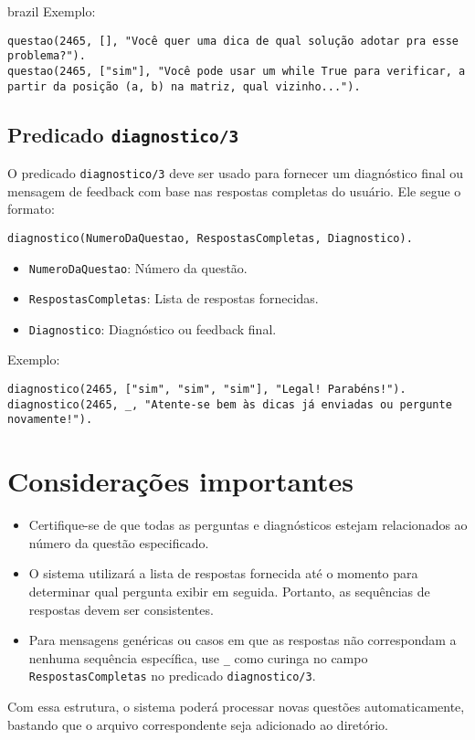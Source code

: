 \begin{otherlanguage*}{brazil}
Exemplo:
\begin{verbatim}
questao(2465, [], "Você quer uma dica de qual solução adotar pra esse problema?").
questao(2465, ["sim"], "Você pode usar um while True para verificar, a partir da posição (a, b) na matriz, qual vizinho...").
\end{verbatim}

\subsection{Predicado \texttt{diagnostico/3}}
O predicado \texttt{diagnostico/3} deve ser usado para fornecer um diagnóstico final ou mensagem de feedback com base nas respostas completas do usuário. Ele segue o formato:
\begin{verbatim}
diagnostico(NumeroDaQuestao, RespostasCompletas, Diagnostico).
\end{verbatim}

\begin{itemize}
    \item \texttt{NumeroDaQuestao}: Número da questão.
    \item \texttt{RespostasCompletas}: Lista de respostas fornecidas.
    \item \texttt{Diagnostico}: Diagnóstico ou feedback final.
\end{itemize}

Exemplo:
\begin{verbatim}
diagnostico(2465, ["sim", "sim", "sim"], "Legal! Parabéns!").
diagnostico(2465, _, "Atente-se bem às dicas já enviadas ou pergunte novamente!").
\end{verbatim}

\section{Considerações importantes}
\begin{itemize}
    \item Certifique-se de que todas as perguntas e diagnósticos estejam relacionados ao número da questão especificado.
    \item O sistema utilizará a lista de respostas fornecida até o momento para determinar qual pergunta exibir em seguida. Portanto, as sequências de respostas devem ser consistentes.
    \item Para mensagens genéricas ou casos em que as respostas não correspondam a nenhuma sequência específica, use \texttt{\_} como curinga no campo \texttt{RespostasCompletas} no predicado \texttt{diagnostico/3}.
\end{itemize}

Com essa estrutura, o sistema poderá processar novas questões automaticamente, bastando que o arquivo correspondente seja adicionado ao diretório.

\end{otherlanguage*}


